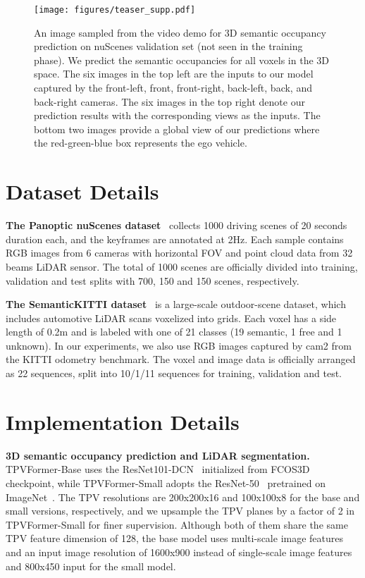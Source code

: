 \documentclass[10pt,twocolumn,letterpaper]{article}
\begin{document}
\appendix



\begin{figure*}[t]
\centering
\texttt{[image: figures/teaser\_supp.pdf]}
\vspace{-7mm}
\caption{An image sampled from the video demo for 3D semantic occupancy prediction on nuScenes validation set (not seen in the training phase). 
    We predict the semantic occupancies for all voxels in the 3D space.
    The six images in the top left are the inputs to our model captured by the front-left, front, front-right, back-left, back, and back-right cameras. 
    The six images in the top right denote our prediction results with the corresponding views as the inputs.
    The bottom two images provide a global view of our predictions where the red-green-blue box represents the ego vehicle.
}
\label{teaser_supp}
\vspace{-5mm}
\end{figure*}





\appendix


\section{Dataset Details} \label{dataset}

\textbf{The Panoptic nuScenes dataset}~\cite{fong2021panoptic} collects 1000 driving scenes of 20 seconds duration each, and the keyframes are annotated at 2Hz.
Each sample contains RGB images from 6 cameras with  horizontal FOV and point cloud data from 32 beams LiDAR sensor.
The total of 1000 scenes are officially divided into training, validation and test splits with 700, 150 and 150 scenes, respectively.

\textbf{The SemanticKITTI dataset}~\cite{semantickitti} is a large-scale outdoor-scene dataset, which includes automotive LiDAR scans voxelized into  grids.
Each voxel has a side length of 0.2m and is labeled with one of 21 classes (19 semantic, 1 free and 1 unknown).
In our experiments, we also use RGB images captured by cam2 from the KITTI odometry benchmark.
The voxel and image data is officially arranged as 22 sequences, split into 10/1/11 sequences for training, validation and test. 

\section{Implementation Details} \label{app:implement}
\textbf{3D semantic occupancy prediction and LiDAR segmentation.}
TPVFormer-Base uses the ResNet101-DCN~\cite{resnet,dcn} initialized from FCOS3D~\cite{fcos3d} checkpoint, while TPVFormer-Small adopts the ResNet-50~\cite{resnet} pretrained on ImageNet~\cite{deng2009imagenet}.
The TPV resolutions are 200x200x16 and 100x100x8 for the base and small versions, respectively, and we upsample the TPV planes by a factor of 2 in TPVFormer-Small for finer supervision.
Although both of them share the same TPV feature dimension of 128, the base model uses multi-scale image features and an input image resolution of 1600x900 instead of single-scale image features and 800x450 input for the small model.
\end{document}

